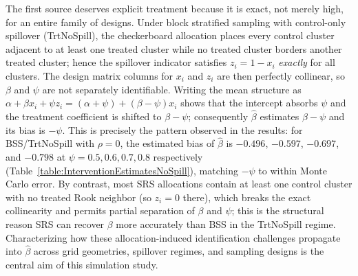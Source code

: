 \documentclass{article}[11pt]
\begin{document}
The first source deserves explicit treatment because it is exact, not merely high, for an entire family of designs. Under block stratified sampling with control-only spillover (TrtNoSpill), the checkerboard allocation places every control cluster adjacent to at least one treated cluster while no treated cluster borders another treated cluster; hence the spillover indicator satisfies $z_i = 1 - x_i$ \emph{exactly} for all clusters. The design matrix columns for $x_i$ and $z_i$ are then perfectly collinear, so $\beta$ and $\psi$ are not separately identifiable. Writing the mean structure as $\alpha + \beta x_i + \psi z_i = (\alpha + \psi) + (\beta - \psi)x_i$ shows that the intercept absorbs $\psi$ and the treatment coefficient is shifted to $\beta - \psi$; consequently $\hat{\beta}$ estimates $\beta - \psi$ and its bias is $-\psi$. This is precisely the pattern observed in the results: for BSS/TrtNoSpill with $\rho = 0$, the estimated bias of $\hat{\beta}$ is $-0.496$, $-0.597$, $-0.697$, and $-0.798$ at $\psi = 0.5, 0.6, 0.7, 0.8$ respectively (Table~\ref{table:InterventionEstimatesNoSpill}), matching $-\psi$ to within Monte Carlo error. By contrast, most SRS allocations contain at least one control cluster with no treated Rook neighbor (so $z_i = 0$ there), which breaks the exact collinearity and permits partial separation of $\beta$ and $\psi$; this is the structural reason SRS can recover $\beta$ more accurately than BSS in the TrtNoSpill regime. Characterizing how these allocation-induced identification challenges propagate into $\hat{\beta}$ across grid geometries, spillover regimes, and sampling designs is the central aim of this simulation study.
\end{document}
